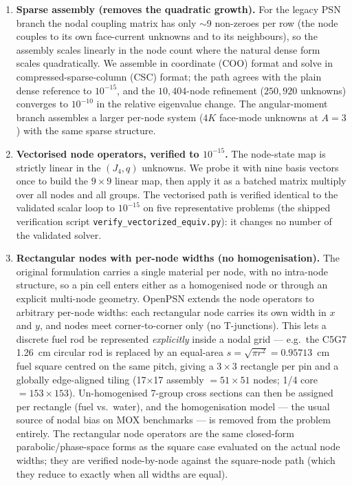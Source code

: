 \documentclass[11pt,a4paper]{article}
\begin{document}
\begin{enumerate}[label=\textbf{(\roman*)}, leftmargin=2.2em]
\item \textbf{Sparse assembly (removes the quadratic growth).}
  For the legacy PSN branch the nodal coupling matrix has only
  $\sim$9 non-zeroes per row (the node couples to its own face-current
  unknowns and to its neighbours), so the assembly scales linearly in
  the node count where the natural dense form scales quadratically. We
  assemble in coordinate (COO) format and solve in
  compressed-sparse-column (CSC) format; the path agrees with the plain
  dense reference to $10^{-15}$, and the $10{,}404$-node refinement
  ($250{,}920$ unknowns) converges to $10^{-10}$ in the
  relative eigenvalue change. The angular-moment branch assembles a
  larger per-node system ($4K$ face-mode unknowns at $A{=}3$) with the
  same sparse structure.

\item \textbf{Vectorised node operators, verified to $10^{-15}$.}
  The node-state map is strictly linear in the $(J_4,q)$ unknowns. We probe
  it with nine basis vectors once to build the $9\times9$ linear map, then
  apply it as a batched matrix multiply over all nodes and all groups.
  The vectorised path is verified identical to the validated scalar loop to
  $10^{-15}$ on five representative problems (the shipped verification
  script \texttt{verify\_vectorized\_equiv.py}): it changes no
  number of the validated solver.

\item \textbf{Rectangular nodes with per-node widths (no
  homogenisation).}
The original formulation carries a single material per node, with
no intra-node structure, so a pin cell enters either as a
homogenised node or through an explicit multi-node geometry.
OpenPSN extends the node operators to arbitrary
  per-node widths: each rectangular node carries its own width in $x$ and
  $y$, and nodes meet corner-to-corner only (no T-junctions). This lets a
  discrete fuel rod be represented \emph{explicitly} inside a nodal grid ---
  e.g.\ the C5G7 1.26~cm circular rod is replaced by an equal-area
  $s=\sqrt{\pi r^{2}}=0.95713$~cm fuel square centred on the same pitch,
  giving a $3\times3$ rectangle per pin and a globally edge-aligned tiling
  (17$\times$17 assembly $=51\times51$ nodes; 1/4 core $=153\times153$).
  Un-homogenised 7-group cross sections can then be assigned per
  rectangle (fuel vs.\ water), and the homogenisation model --- the usual
  source of nodal bias on MOX benchmarks --- is removed from the problem
  entirely. The rectangular node operators are the same closed-form
  parabolic/phase-space forms as the square case evaluated on the actual
  node widths; they are verified node-by-node against the square-node path
  (which they reduce to exactly when all widths are equal).


\end{enumerate}
\end{document}

